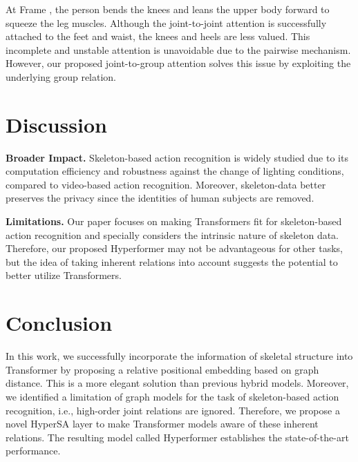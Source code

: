 \documentclass[10pt,twocolumn,letterpaper]{article}
\begin{document}
At Frame , the person bends the knees and leans the upper body forward to squeeze the leg muscles. Although the joint-to-joint attention is successfully attached to the feet and waist, the knees and heels are less valued. This incomplete and unstable attention is unavoidable due to the pairwise mechanism. However, our proposed joint-to-group attention solves this issue by exploiting the underlying group relation.  

\section{Discussion}
\noindent\textbf{Broader Impact. }
Skeleton-based action recognition is widely studied due to its computation efficiency and robustness against the change of lighting conditions, compared to video-based action recognition. Moreover, skeleton-data better preserves the privacy since the identities of human subjects are removed. 

\noindent\textbf{Limitations.}
\label{limit}
Our paper focuses on making Transformers fit for skeleton-based action recognition and specially considers the intrinsic nature of skeleton data. Therefore, our proposed Hyperformer may not be advantageous for other tasks, but the idea of taking inherent relations into account suggests the potential to better utilize Transformers. 
\section{Conclusion}

In this work, we successfully incorporate the information of skeletal structure into Transformer by proposing a relative positional embedding based on graph distance. This is a more elegant solution than previous hybrid models. Moreover, we identified a limitation of graph models for the task of skeleton-based action recognition, i.e., high-order joint relations are ignored.
Therefore, we propose a novel HyperSA layer to make Transformer models aware of these inherent relations. 
The resulting model called Hyperformer establishes the state-of-the-art performance.

\clearpage

{\small


}
\end{document}
